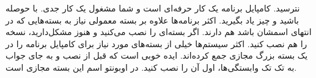 نترسید. کامپایل برنامه یک کار حرفه‌ای است و شما مشغول یک کار جدی. با حوصله باشید و چیز یاد بگیرید.
اکثر برنامه‌ها علاوه بر بسته معمولی نیاز به بسته‌هایی که در انتهای اسمشان 
 باشد هم دارند. اگر بسته‌ای را نصب می‌کنید و هنوز مشکل‌دارید، نسخه 
 را هم نصب کنید.
اکثر سیستم‌ها خیلی از بسته‌های مورد نیاز برای کامپایل برنامه را در یک بسته بزرگ مجازی جمع کرده‌اند. ایده خوبی است که قبل از نصب و به جای جواب به تک تک وابستگی‌ها، اول آن را نصب کنید. در اوبونتو اسم این بسته مجازی 
 است.

